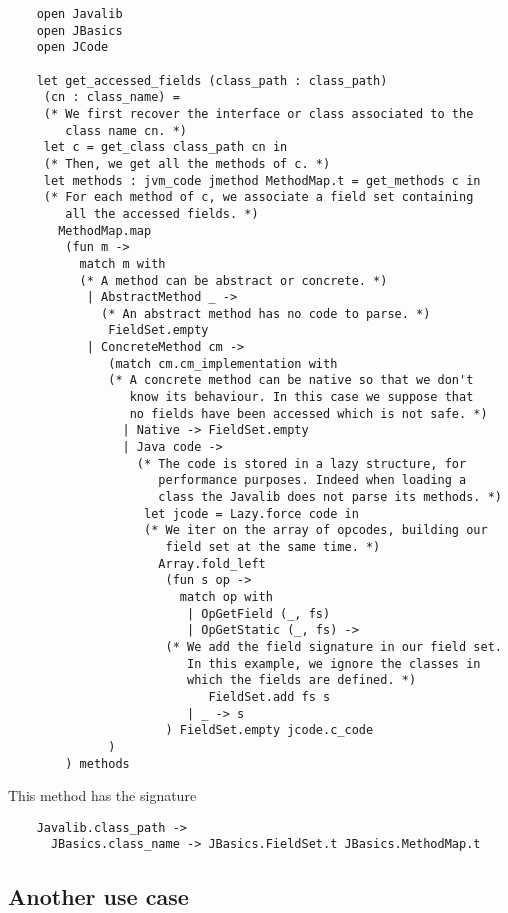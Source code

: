 \documentclass{article}
\begin{document}
\begin{verbatim}
    open Javalib
    open JBasics
    open JCode

    let get_accessed_fields (class_path : class_path)
     (cn : class_name) =
     (* We first recover the interface or class associated to the
        class name cn. *)
     let c = get_class class_path cn in
     (* Then, we get all the methods of c. *)
     let methods : jvm_code jmethod MethodMap.t = get_methods c in
     (* For each method of c, we associate a field set containing
        all the accessed fields. *)
       MethodMap.map
        (fun m ->
          match m with
          (* A method can be abstract or concrete. *)
           | AbstractMethod _ ->
             (* An abstract method has no code to parse. *)
              FieldSet.empty
           | ConcreteMethod cm ->
              (match cm.cm_implementation with
              (* A concrete method can be native so that we don't
                 know its behaviour. In this case we suppose that
                 no fields have been accessed which is not safe. *)
                | Native -> FieldSet.empty
                | Java code ->
                  (* The code is stored in a lazy structure, for
                     performance purposes. Indeed when loading a
                     class the Javalib does not parse its methods. *)
                   let jcode = Lazy.force code in
                   (* We iter on the array of opcodes, building our
                      field set at the same time. *)
                     Array.fold_left
                      (fun s op ->
                        match op with
                         | OpGetField (_, fs)
                         | OpGetStatic (_, fs) ->
                      (* We add the field signature in our field set.
                         In this example, we ignore the classes in
                         which the fields are defined. *)
                            FieldSet.add fs s
                         | _ -> s
                      ) FieldSet.empty jcode.c_code
              )
        ) methods
\end{verbatim}
This method has the signature

\begin{verbatim}
    Javalib.class_path ->
      JBasics.class_name -> JBasics.FieldSet.t JBasics.MethodMap.t
\end{verbatim}
\subsection{Another use case}
\end{document}

